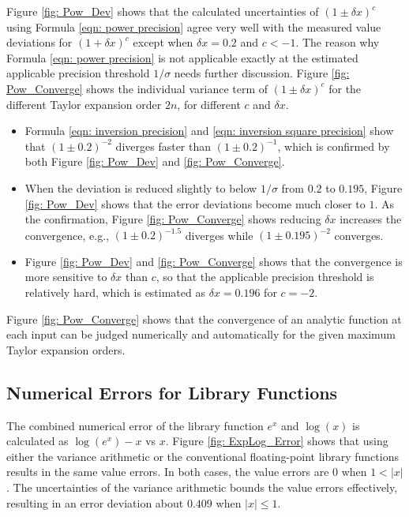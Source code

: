 \documentclass[twoside]{article}
\numberwithin{equation}{section}
\begin{document}
Figure \ref{fig: Pow_Dev} shows that the calculated uncertainties of $(1 \pm \delta x)^c$ using Formula \eqref{eqn: power precision} agree very well with the measured value deviations for $(1 + \delta x)^c$ except when $\delta x =0.2$ and $c < -1$.
The reason why Formula \eqref{eqn: power precision} is not applicable exactly at the estimated applicable precision threshold $1/\sigma$ needs further discussion.
Figure \ref{fig: Pow_Converge} shows the individual variance term of $(1 \pm \delta x)^c$ for the different Taylor expansion order $2n$, for different $c$ and $\delta x$.
\begin{itemize}

\item Formula \eqref{eqn: inversion precision} and \eqref{eqn: inversion square precision} show that $(1 \pm 0.2)^{-2}$ diverges faster than $(1 \pm 0.2)^{-1}$, which is confirmed by both Figure \ref{fig: Pow_Dev} and \ref{fig: Pow_Converge}.

\item 
When the deviation is reduced slightly to below $1/\sigma$ from $0.2$ to $0.195$, Figure \ref{fig: Pow_Dev} shows that the error deviations become much closer to $1$.  
As the confirmation, Figure \ref{fig: Pow_Converge} shows reducing $\delta x$ increases the convergence, e.g., $(1 \pm 0.2)^{-1.5}$ diverges while $(1 \pm 0.195)^{-2}$ converges.

\item Figure \ref{fig: Pow_Dev} and \ref{fig: Pow_Converge} shows that the convergence is more sensitive to $\delta x$ than $c$, so that the applicable precision threshold is relatively hard, which is estimated as $\delta x = 0.196$ for $c=-2$.

\end{itemize}
Figure \ref{fig: Pow_Converge} shows that the convergence of an analytic function at each input can be judged numerically and automatically for the given maximum Taylor expansion orders.



\subsection{Numerical Errors for Library Functions}

The combined numerical error of the library function $e^x$ and $\log(x)$ is calculated as $\log(e^x) - x$ vs $x$.
Figure \ref{fig: ExpLog_Error} shows that using either the variance arithmetic or the conventional floating-point library functions results in the same value errors.  
In both cases, the value errors are $0$ when $1 < |x|$.
The uncertainties of the variance arithmetic bounds the value errors effectively, resulting in an error deviation about $0.409$ when $|x| \leq 1$.
\end{document}
